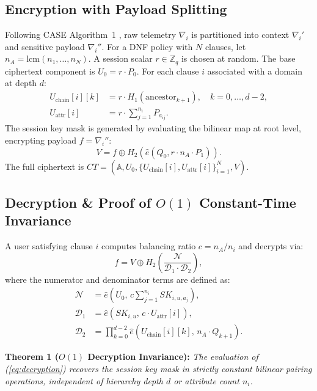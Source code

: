 \documentclass[conference]{IEEEtran}
\begin{document}
\subsection{Encryption with Payload Splitting}
Following CASE Algorithm~1 \cite{ghosh2022case}, raw telemetry $\nabla_i$ is partitioned into context $\nabla_i'$ and sensitive payload $\nabla_i''$. For a DNF policy with $N$ clauses, let $n_A = \text{lcm}(n_1, \dots, n_N)$. A session scalar $r \in \mathbb{Z}_q$ is chosen at random. The base ciphertext component is $U_0 = r \cdot P_0$.
For each clause $i$ associated with a domain at depth $d$:
\begin{align}
  U_{\text{chain}}[i][k] &= r \cdot H_1(\text{ancestor}_{k+1}), \quad k = 0, \dots, d-2, \\
  U_{\text{attr}}[i] &= r \cdot \sum_{j=1}^{n_i} P_{a_{ij}}.
\end{align}
The session key mask is generated by evaluating the bilinear map at root level, encrypting payload $f = \nabla_i''$:
\begin{equation}
  V = f \oplus H_2\left( \hat{e}(Q_0, r \cdot n_A \cdot P_1) \right).
\end{equation}
The full ciphertext is $CT = (\mathbb{A}, U_0, \{U_{\text{chain}}[i], U_{\text{attr}}[i]\}_{i=1}^N, V)$.

\subsection{Decryption \& Proof of $O(1)$ Constant-Time Invariance}
A user satisfying clause $i$ computes balancing ratio $c = n_A / n_i$ and decrypts via:
\begin{equation}
  f = V \oplus H_2\left( \frac{\mathcal{N}}{\mathcal{D}_1 \cdot \mathcal{D}_2} \right),
\label{eq:decryption}
\end{equation}
where the numerator and denominator terms are defined as:
\begin{align}
  \mathcal{N} &= \hat{e}\left( U_0,\, c \sum\nolimits_{j=1}^{n_i} SK_{i, u, a_j} \right), \\
  \mathcal{D}_1 &= \hat{e}\left( SK_{i, u},\, c \cdot U_{\text{attr}}[i] \right), \\
  \mathcal{D}_2 &= \prod\nolimits_{k=0}^{d-2} \hat{e}\left( U_{\text{chain}}[i][k],\, n_A \cdot Q_{k+1} \right).
\end{align}

\noindent\textbf{Theorem 1 ($O(1)$ Decryption Invariance):} \textit{The evaluation of (\ref{eq:decryption}) recovers the session key mask in strictly constant bilinear pairing operations, independent of hierarchy depth $d$ or attribute count $n_i$.}
\end{document}
